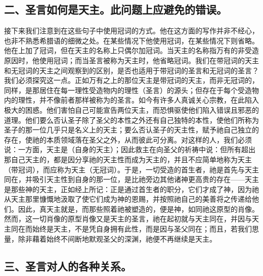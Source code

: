 
\subsection{二、圣言如何是天主。此问题上应避免的错误。}

接下来我们注意到在这些句子中使用冠词的方式。他在这方面的写作并非不经心，也非不熟悉希腊语的细微之处。在某些情况下他使用冠词，在某些情况下则省略。他在上加了冠词，但在天主的名称上只偶尔加冠词。当天主的名称指万有的非受造原因时，他使用冠词；而当圣言被称为天主时，他省略冠词。我们在带冠词的天主和无冠词的天主之间观察到的区别，是否也适用于带冠词的圣言和无冠词的圣言？我们必须探究这一点。正如万有之上的那位天主是带冠词的天主，而非无冠词的，同样，是那居住在每一理性受造物内的理性（圣言）的源头；但存在于每个受造物内的理性，并不像前者那样被称为的圣言。如今有许多人真诚关心宗教，在此陷入极大的困惑。他们害怕自己可能宣告两位天主，而恐惧驱使他们陷入错误且邪恶的道理。他们要么否认圣子除了圣父的本性之外还有自己独特的本性，使他们所称为圣子的那一位几乎只是名义上的天主；要么否认圣子的天主性，赋予祂自己独立的存在，使祂的本质领域落在圣父之外，从而彼此可分离。对这样的人，我们必须说：一方面，天主是（自身的天主）；因此救主在向圣父的祈祷中说：但所有超出那自己天主的，都是因分享祂的天主性而成为天主的，并且不应简单地称为天主（带冠词），而应称为天主（无冠词）。于是，一切受造的首生者，祂是首先与天主同在，并吸引天主性到自身的那一位，是比祂旁边其他诸神更高贵的存在——天主是那些神的天主，正如经上所记：正是通过首生者的职分，它们才成了神，因为祂从天主那里慷慨地汲取了使它们成为神的恩赐，并按照祂自己的美善将之传递给他们。因此，真天主就是，而那些照着祂被塑造的，便是神，如同祂这原型的肖像。然而，这一切肖像的原型肖像又是天主的圣言，祂在起初就与天主同在，并因与天主同在而始终是天主，不是凭自身拥有此性，而是因与圣父同在；而且，若我们思量，除非藉着始终不间断地默观圣父的深渊，祂便不再继续是天主。\par


\subsection{三、圣言对人的各种关系。}

